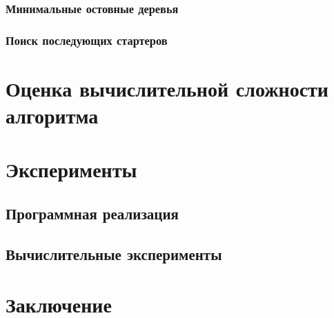 \documentclass[12pt]{article}
\begin{document}
\subsubsection{Минимальные остовные деревья}

\subsubsection{Поиск последующих стартеров}

\section{Оценка вычислительной сложности алгоритма}

\section{Эксперименты}

\subsection{Программная реализация}

\subsection{Вычислительные эксперименты}

\section{Заключение}

\newpage




\end{document}
